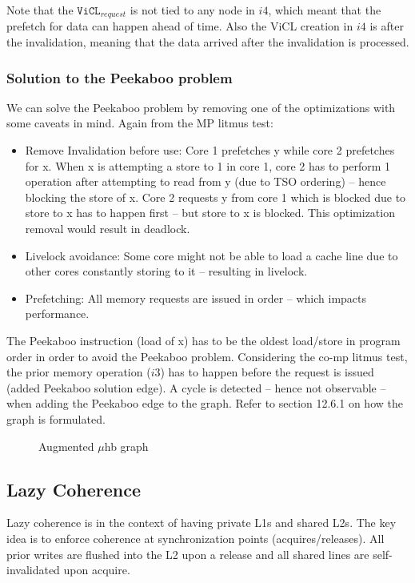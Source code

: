 \documentclass{article}
\begin{document}
\begin{multicols*}{2}
\noindent\newline
Note that the $\texttt{ViCL}_{request}$ is not tied to any node in $i4$, which meant that the prefetch for data can happen ahead of time. Also the ViCL creation in $i4$ is after the invalidation, meaning that the data arrived after the invalidation is processed.

\subsubsection{Solution to the Peekaboo problem}
We can solve the Peekaboo problem by removing one of the optimizations with some caveats in mind. Again from the MP litmus test:
\begin{itemize}
    \item Remove Invalidation before use: Core 1 prefetches y while core 2 prefetches for x. When x is attempting a store to 1 in core 1, core 2 has to perform 1 operation after attempting to read from y (due to TSO ordering) -- hence blocking the store of x. Core 2 requests y from core 1 which is blocked due to store to x has to happen first -- but store to x is blocked. This optimization removal would result in deadlock.
    \item Livelock avoidance: Some core might not be able to load a cache line due to other cores constantly storing to it -- resulting in livelock.
    \item Prefetching: All memory requests are issued in order -- which impacts performance.
\end{itemize}

\noindent\newline
The Peekaboo instruction (load of x) has to be the oldest load/store in program order in order to avoid the Peekaboo problem. Considering the co-mp litmus test, the prior memory operation ($i3$) has to happen before the request is issued (added Peekaboo solution edge). A cycle is detected -- hence not observable -- when adding the Peekaboo edge to the graph. Refer to section 12.6.1 on how the graph is formulated.

\begin{figure}[H]
  \caption{Augmented $\mu$hb graph}
\end{figure}

\subsection{Lazy Coherence}
Lazy coherence is in the context of having private L1s and shared L2s. The key idea is to enforce coherence at synchronization points (acquires/releases). All prior writes are flushed into the L2 upon a release and all shared lines are self-invalidated upon acquire.


\end{multicols*}
\end{document}

